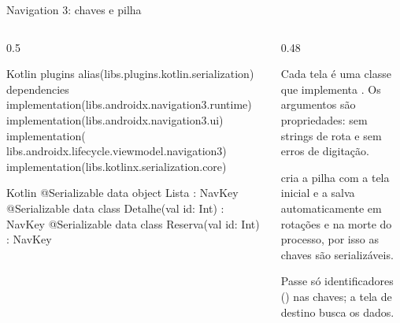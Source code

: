 \documentclass[aspectratio=169,10pt]{beamer}
\begin{document}
\begin{frame}[fragile]{Navigation 3: chaves e pilha}
  \begin{columns}[T]
    \begin{column}{0.5\textwidth}
\begin{codigo}[title=app/build.gradle.kts]{Kotlin}
plugins {
  alias(libs.plugins.kotlin.serialization)
}
dependencies {
  implementation(libs.androidx.navigation3.runtime)
  implementation(libs.androidx.navigation3.ui)
  implementation(
    libs.androidx.lifecycle.viewmodel.navigation3)
  implementation(libs.kotlinx.serialization.core)
}
\end{codigo}
\begin{codigo}[title=Rotas.kt]{Kotlin}
@Serializable data object Lista : NavKey
@Serializable data class Detalhe(val id: Int) : NavKey
@Serializable data class Reserva(val id: Int) : NavKey
\end{codigo}
    \end{column}
    \begin{column}{0.48\textwidth}
      \begin{conceito}
        Cada tela é uma classe  que implementa . Os argumentos são propriedades: sem strings de rota e sem erros de digitação.
      \end{conceito}
      \begin{conceito}
         cria a pilha com a tela inicial e a salva automaticamente em rotações e na morte do processo, por isso as chaves são serializáveis.
      \end{conceito}
      \begin{dica}
        Passe só identificadores () nas chaves; a tela de destino busca os dados.
      \end{dica}
    \end{column}
  \end{columns}
\end{frame}
\end{document}
